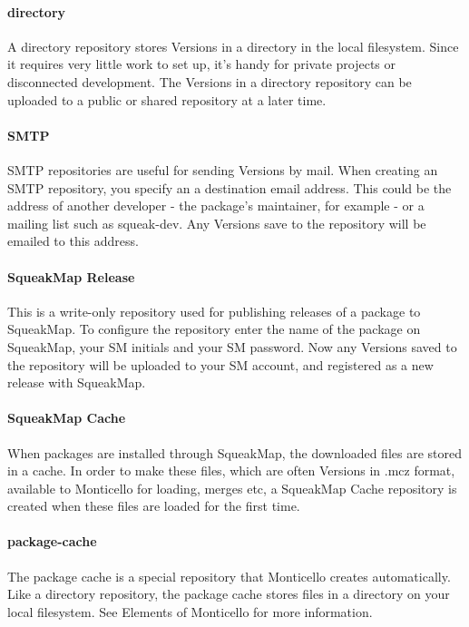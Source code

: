 \documentclass[a4paper,10pt,twoside]{book}
\begin{document}
\paragraph{directory}

A directory repository stores Versions in a directory in the local filesystem. Since it requires very little work to set up, it's handy for private projects or disconnected development. The Versions in a directory repository can be uploaded to a public or shared repository at a later time.

\paragraph{SMTP}

SMTP repositories are useful for sending Versions by mail. When creating an SMTP repository, you specify an a destination email address. This could be the address of another developer - the package's maintainer, for example - or a mailing list such as squeak-dev. Any Versions save to the repository will be emailed to this address.

\paragraph{SqueakMap Release}

This is a write-only repository used for publishing releases of a package to SqueakMap. To configure the repository enter the name of the package on SqueakMap, your SM initials and your SM password. Now any Versions saved to the repository will be uploaded to your SM account, and registered as a new release with SqueakMap.

\paragraph{SqueakMap Cache}

When packages are installed through SqueakMap, the downloaded files are stored in a cache. In order to make these files, which are often Versions in .mcz format, available to Monticello for loading, merges etc, a SqueakMap Cache repository is created when these files are loaded for the first time.

\paragraph{package-cache}

The package cache is a special repository that Monticello creates automatically. Like a directory repository, the package cache stores files in a directory on your local filesystem. See Elements of Monticello for more information.
\end{document}
